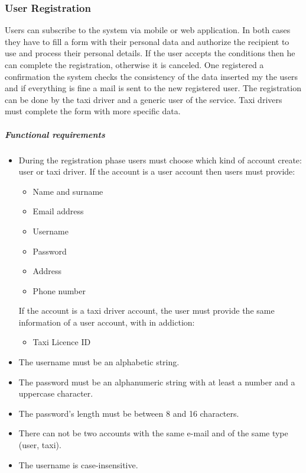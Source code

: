 \subsubsection{User Registration}
Users can subscribe to the system via mobile or web application. In both cases they have to fill a form with their personal data and authorize the recipient to use and process their personal details.
If the user accepts the conditions then he can complete the registration, otherwise it is canceled.
One registered a confirmation the system checks the consistency of the data inserted my the users and if everything is fine a mail is sent to the new registered user.
The registration can be done by the taxi driver and a generic user of the service. Taxi drivers must complete the form with more specific data.

	\subparagraph{Functional requirements}
	\noindent
		\begin{itemize}
			\item  During the registration phase users must choose which kind of account create: user or taxi driver.
			If the account is a user account then users must provide:
			\begin{itemize}
				\item Name and surname
				\item Email address
				\item Username
				\item Password
				\item Address
				\item Phone number
			\end{itemize}
			If the account is a taxi driver account, the user must provide the same information of a user account, with in addiction:
			\begin{itemize}
				\item Taxi Licence ID
			\end{itemize}
			\item The username must be an alphabetic string.
			\item The password must be an alphanumeric string with at least a number and a uppercase character.
			\item The password's length must be between 8 and 16 characters.
			\item There can not be two accounts with the same e-mail and of the same type (user, taxi).
			\item The username is case-insensitive.
		\end{itemize}


